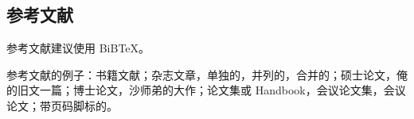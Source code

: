 \subsection{参考文献}

参考文献建议使用 BiB\TeX 。

参考文献的例子：书籍文献\cite{tex,companion}；杂志文章，单独的\cite{article1}，并列的\cite{article2,article3}，合并的\cite{article1,article2,article3}；硕士论文\cite{master}，俺的旧文一篇；博士论文\cite{doctor}，沙师弟的大作；论文集或 Handbook\cite{collection}，会议论文集\cite{proceeding}，会议论文\cite{conference}；带页码脚标的\cite[123]{tex}。


